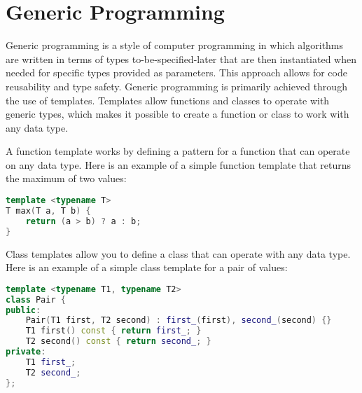 \section{Generic Programming}

Generic programming is a style of computer programming in which
algorithms are written in terms of types to-be-specified-later
that are then instantiated when needed for specific types provided
as parameters. This approach allows for code reusability and type safety.
Generic programming is primarily achieved through the use of templates.
Templates allow functions and classes to operate with generic types,
which makes it possible to create a function or class to work with
any data type.

A function template works by defining a pattern for a function that can
operate on any data type. Here is an example of a simple function template
that returns the maximum of two values:

\begin{lstlisting}[language=C++]
template <typename T>
T max(T a, T b) {
    return (a > b) ? a : b;
}
\end{lstlisting}
Class templates allow you to define a class that can operate with
any data type. Here is an example of a simple class template for a
pair of values:

\begin{lstlisting}[language=C++]
template <typename T1, typename T2>
class Pair {
public:
    Pair(T1 first, T2 second) : first_(first), second_(second) {}
    T1 first() const { return first_; }
    T2 second() const { return second_; }
private:
    T1 first_;
    T2 second_;
};
\end{lstlisting}